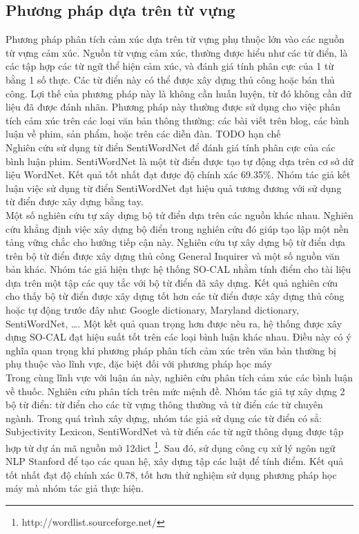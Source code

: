 \subsection{Phương pháp dựa trên từ vựng}
Phương pháp phân tích cảm xúc dựa trên từ vựng phụ thuộc lớn vào các nguồn từ vựng cảm xúc. Nguồn từ vựng cảm xúc, thường được hiểu như các từ điển, là các tập hợp các từ ngữ thể hiện cảm xúc, và đánh giá tính phân cực của 1 từ bằng 1 số thực. Các từ điển này có thể được xây dựng thủ công hoặc bán thủ công. Lợi thế của phương pháp này là không cần huấn luyện, từ đó không cần dữ liệu đã được đánh nhãn. Phương pháp này thường được sử dụng cho việc phân tích cảm xúc trên các loại văn bản thông thường: các bài viết trên blog, các bình luận về phim, sản phẩm, hoặc trên các diễn đàn. TODO hạn chế \\

Nghiên cứu \cite{ohana2009sentiment} sử dụng từ điển SentiWordNet để đánh giá tính phân cực của các bình luận phim. SentiWordNet là một từ điển được tạo tự động dựa trên cơ sở dữ liệu WordNet. Kết quả tốt nhất đạt được độ chính xác 69.35\%. Nhóm tác giả kết luận việc sử dụng từ điển SentiWordNet đạt hiệu quả tương đương với sử dụng từ điển được xây dựng bằng tay.\\

Một số nghiên cứu tự xây dựng bộ tử điển dựa trên các nguồn khác nhau. Nghiên cứu \cite{taboada2011lexicon} khẳng định việc xây dựng bộ điển trong nghiên cứu đó giúp tạo lập một nền tảng vững chắc cho hướng tiếp cận này. Nghiên cứu tự xây dựng bộ từ điển dựa trên bộ từ điển được xây dựng thủ công General Inquirer và một số nguồn văn bản khác. Nhóm tác giả hiện thực hệ thống SO-CAL nhằm tính điểm cho tài liệu dựa trên một tập các quy tắc với bộ từ điển đã xây dựng. Kết quả nghiên cứu cho thấy bộ từ điển được xây dựng tốt hơn các từ điển được xây dựng thủ công hoặc tự động trước đây như: Google dictionary, Maryland dictionary, SentiWordNet, \ldots. Một kết quả quan trọng hơn được nêu ra, hệ thống được xây dựng SO-CAL đạt hiệu suất tốt trên các loại bình luận khác nhau. Điều này có ý nghĩa quan trọng khi phương pháp phân tích cảm xúc trên văn bản thường bị phụ thuộc vào lĩnh vực, đặc biệt đối với phương pháp học máy \cite{Giachanou2016}\\

Trong cùng lĩnh vực với luận án này, nghiên cứu \cite{na2012sentiment} phân tích cảm xúc các bình luận về thuốc. Nghiên cứu phân tích trên mức mệnh đề. Nhóm tác giả tự xây dựng 2 bộ từ điển: từ điển cho các từ vựng thông thường và từ điển các từ chuyên ngành. Trong quá trình xây dựng, nhóm tác giả sử dụng các từ điển có sẳ:  Subjectivity Lexicon, SentiWordNet và từ điển các từ ngữ thông dụng được tập hợp từ dự án mã nguồn mở 12dict \footnote{http://wordlist.sourceforge.net/}. Sau đó, sử dụng công cụ xử lý ngôn ngữ NLP Stanford để tạo các quan hệ, xây dựng tập các luật để tính điểm. Kết quả tốt nhất đạt độ chính xác 0.78, tốt hơn thử nghiệm sử dụng phương pháp học máy mà nhóm tác giả thực hiện.
